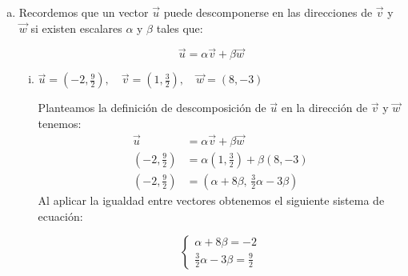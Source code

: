\documentclass[11pt,a4paper]{article}
\newcommand{\iv}{\bm{\check{\imath}}}
\newcommand{\jv}{\bm{\check{\jmath}}}
\newcommand{\kv}{\check{\bm k}}
\begin{document}
\begin{enumerate}[\hspace{-5mm} 1) ]
\begin{enumerate}[a)]
\begin{enumerate}[a)]
\end{enumerate}

\textbf{Resultados:}
\begin{enumerate} 
\end{enumerate}



    \item Recordemos que un vector $\vec{u}$ puede descomponerse en las direcciones de $\vec{v}$ y $\vec{w}$ si existen escalares $\alpha$ y $\beta$ tales que:

$$
\vec{u} = \alpha \vec{v} + \beta \vec{w}
$$

    \begin{enumerate}[i)]
        \item  $\vec{u} = \left(-2, \frac{9}{2}\right), \quad \vec{v} = \left(1, \frac{3}{2}\right), \quad \vec{w} = (8, -3)$

        Planteamos la definición de descomposición de $\vec{u}$ en la dirección de  $\vec{v}$ y $\vec{w}$ tenemos:
\begin{align*}
    \vec{u} &= \alpha \vec{v} + \beta \vec{w}
    \\
    \left(-2, \frac{9}{2}\right) &= \alpha \left(1, \frac{3}{2}\right) + \beta  (8, -3)
    \\
    \left(-2, \frac{9}{2}\right) &= \left( \alpha + 8\beta ,\, \tfrac{3}{2} \alpha - 3\beta \right)
\end{align*}
Al aplicar la igualdad entre vectores obtenemos el siguiente sistema de ecuación:

$$
\begin{cases}
\alpha + 8\beta = -2 \\
\frac{3}{2} \alpha - 3\beta = \frac{9}{2}
\end{cases}
$$


\end{enumerate}
\end{enumerate}
\end{enumerate}
\end{document}
